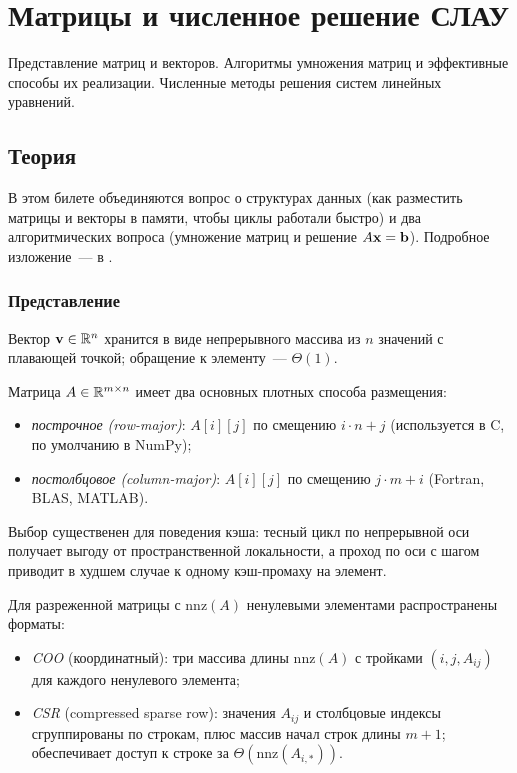 
\section{Матрицы и численное решение СЛАУ}
\label{sec:1.3.04-matrix-numerical-linear}

\begin{ticket}
Представление матриц и векторов. Алгоритмы умножения матриц и эффективные способы их реализации. Численные методы решения систем линейных уравнений.
\end{ticket}

\subsection*{Теория}

В этом билете объединяются вопрос о структурах данных (как разместить
матрицы и векторы в памяти, чтобы циклы работали быстро) и два
алгоритмических вопроса (умножение матриц и решение
$A \mathbf{x} = \mathbf{b}$). Подробное изложение~--- в
\cite[гл.~28]{CLRS2013}.

\subsubsection*{Представление}

Вектор $\mathbf{v} \in \mathbb{R}^n$ хранится в виде непрерывного массива из
$n$ значений с плавающей точкой; обращение к элементу~--- $\Theta(1)$.

Матрица $A \in \mathbb{R}^{m \times n}$ имеет два основных плотных способа
размещения:
\begin{itemize}
  \item \emph{построчное (row-major)}: $A[i][j]$ по смещению
        $i \cdot n + j$ (используется в C, по умолчанию в NumPy);
  \item \emph{постолбцовое (column-major)}: $A[i][j]$ по смещению
        $j \cdot m + i$ (Fortran, BLAS, MATLAB).
\end{itemize}
Выбор существенен для поведения кэша: тесный цикл по непрерывной оси
получает выгоду от пространственной локальности, а проход по оси с
шагом приводит в худшем случае к одному кэш-промаху на элемент.

Для разреженной матрицы с $\mathrm{nnz}(A)$ ненулевыми элементами
распространены форматы:
\begin{itemize}
  \item \emph{COO} (координатный): три массива длины $\mathrm{nnz}(A)$
        с тройками $(i, j, A_{ij})$ для каждого ненулевого элемента;
  \item \emph{CSR} (compressed sparse row): значения $A_{ij}$ и
        столбцовые индексы сгруппированы по строкам, плюс массив
        начал строк длины $m + 1$; обеспечивает доступ к строке за
        $\Theta(\mathrm{nnz}(A_{i,*}))$.
\end{itemize}

